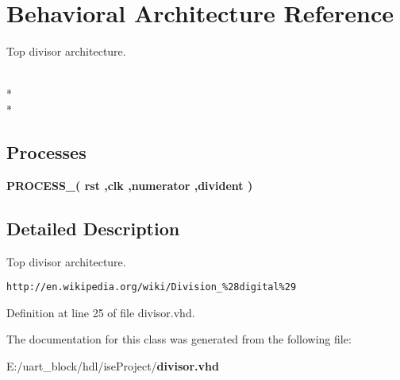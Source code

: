 \section{Behavioral Architecture Reference}
\label{classdivisor_1_1_behavioral}


Top divisor architecture.  


\\*
\\*
\subsection*{Processes}
 \begin{DoxyCompactItemize}
\item 
{\bf P\-R\-O\-C\-E\-S\-S\-\_}{\bfseries  ( {\bfseries {\bfseries {\bf rst}}   ,{\bfseries {\bf clk}}  ,{\bfseries {\bf numerator}}  ,{\bfseries {\bf divident}}  } )}\label{classdivisor_1_1_behavioral_ab649fcbb3f788b8c935538204b832ea0}

\end{DoxyCompactItemize}


\subsection{Detailed Description}
Top divisor architecture. 

{\tt http\-://en.\-wikipedia.\-org/wiki/\-Division\-\_\-\%28digital\%29} 

Definition at line 25 of file divisor.\-vhd.



The documentation for this class was generated from the following file\-:\begin{DoxyCompactItemize}
\item 
E\-:/uart\-\_\-block/hdl/ise\-Project/{\bf divisor.\-vhd}\end{DoxyCompactItemize}
